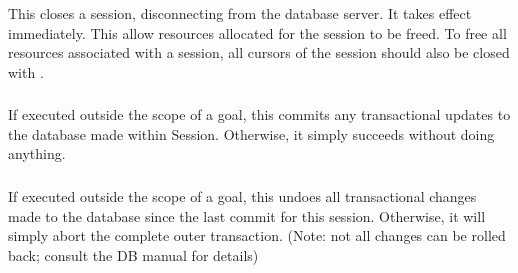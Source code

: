 \subsubsection{}
\label{session-close/1}

This closes a session, disconnecting from the database server. It
takes effect immediately. This allow resources allocated for the
session to be freed. To free all resources associated with a session,
all cursors of the session should also be closed with
. 


\subsubsection{}
\label{session-commit/1}

If executed outside the scope of a
goal, this commits any transactional updates to the database made within
 Session. 
 Otherwise, it simply succeeds without doing anything.

\subsubsection{}
\label{session-rollback/1}

If executed outside the scope of a
goal,
this undoes all transactional changes made to the database since the last
commit for this session. Otherwise, it will simply abort the complete outer
transaction. (Note: not all changes can be rolled back; consult the DB manual for details)

\subsubsection{}
\label{session-transaction/2}

